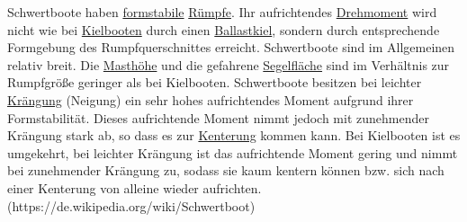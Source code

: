  Schwertboote haben \href{https://de.wikipedia.org/wiki/Formstabilit\%C3\%A4t}{formstabile} \href{https://de.wikipedia.org/wiki/Schiffsrumpf}{Rümpfe}. Ihr aufrichtendes \href{https://de.wikipedia.org/wiki/Drehmoment}{Drehmoment} wird nicht wie bei \href{https://de.wikipedia.org/wiki/Kielboot}{Kielbooten} durch einen \href{https://de.wikipedia.org/wiki/Kiel_(Schiffbau)\#Flossenkiel}{Ballastkiel}, sondern durch entsprechende Formgebung des Rumpfquerschnittes erreicht. Schwertboote sind im Allgemeinen relativ breit. Die \href{https://de.wikipedia.org/wiki/Schiffsmast}{Masthöhe} und die gefahrene \href{https://de.wikipedia.org/wiki/Segelfl\%C3\%A4che}{Segelfläche} sind im Verhältnis zur Rumpfgröße geringer als bei Kielbooten. Schwertboote besitzen bei leichter \href{https://de.wikipedia.org/wiki/Kr\%C3\%A4ngung}{Krängung} (Neigung) ein sehr hohes aufrichtendes Moment aufgrund ihrer Formstabilität. Dieses aufrichtende Moment nimmt jedoch mit zunehmender Krängung stark ab, so dass es zur \href{https://de.wikipedia.org/wiki/Kenterung}{Kenterung} kommen kann. Bei Kielbooten ist es umgekehrt, bei leichter Krängung ist das aufrichtende Moment gering und nimmt bei zunehmender Krängung zu, sodass sie kaum kentern können bzw. sich nach einer Kenterung von alleine wieder aufrichten.  (https://de.wikipedia.org/wiki/Schwertboot)

 

